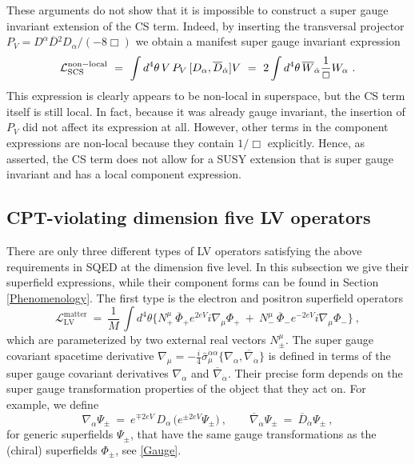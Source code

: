 \documentclass[12pt]{revtex4}
\begin{document}
These arguments do not show that it is impossible to construct a super
gauge invariant extension of the CS term. Indeed, by inserting the
transversal projector 
$P_V = D^\alpha \overline{D}{}^2 D_\alpha/(-8 \Box)$
we obtain a manifest super gauge invariant expression 
%
\begin{equation}
{\cal L}_{\rm SCS}^{\rm non-local} ~=~ \int d^4 \theta \, 
V\, P_V\,  [ D_\alpha, \overline{D}_{\dot\alpha}] V
~=~
2 \int d^4 \theta \, 
\overline{W}_{\dot\alpha} \frac 1{\Box} W_\alpha
~.
\end{equation} 
%
This expression is clearly appears to be non-local in superspace, but
the CS term itself is still local. In fact, because it was already
gauge invariant, the insertion of $P_V$ did not affect its expression
at all. However, other terms in the component expressions are
non-local because they contain $1/\Box$ explicitly. Hence, as
asserted, the CS term does not allow for a SUSY extension that is super
gauge invariant and has a local component expression. 


\subsection{CPT-violating dimension five LV operators}
\label{Dim5LV}


There are only three different types of LV operators satisfying the 
above requirements in SQED at the
dimension five level. In this subsection we give their superfield
expressions, while their component forms can be found in Section
\ref{Phenomenology}. The first type is the electron and positron 
superfield operators  
\begin{equation}
\label{LV_matter}
  \mathcal{L}_{\mathrm{LV}}^{\mathrm{matter}} ~=~ 
\frac{1}{M}\,   \int d^4\theta \Big\{ 
N_+^\mu\, \overline{\Phi}_+ e^{2eV} i \nabla_\mu \Phi_+ 
~+~ N_{-}^\mu\, \overline{\Phi}_- e^{-2eV} i \nabla_\mu  {\Phi}_-
                 \Big\}~, 
\end{equation}
%
which are parameterized by two external real vectors $N_\pm^\mu$.  
The super gauge covariant spacetime derivative 
$\nabla_\mu   =  - \frac{i}{4} 
\bar{\sigma}_\mu^{\dot{\alpha}\alpha}
\{ \nabla_\alpha, \overline{\nabla}_{\dot{\alpha}} \} 
$ 
is defined in terms of the super gauge covariant derivatives 
$\nabla_\alpha$ and $\overline{\nabla}_{\dot{\alpha}}$. Their precise
form depends on the super gauge transformation properties of the
object that they act on. For example, we define 
%
\begin{equation}
\nabla_\alpha \Psi_\pm ~=~ 
e^{\mp 2eV} \, D_\alpha \, \big( e^{\pm 2eV} \Psi_\pm \big)~, 
\qquad 
\overline{\nabla}_{\dot{\alpha}} \Psi_\pm ~=~
\overline{D}_{\dot{\alpha}} \Psi_\pm~,
\end{equation} 
%
for generic superfields $\Psi_\pm$, that have the same gauge
transformations as the (chiral) superfields $\Phi_\pm$, see 
\eqref{Gauge}. 
\end{document}
